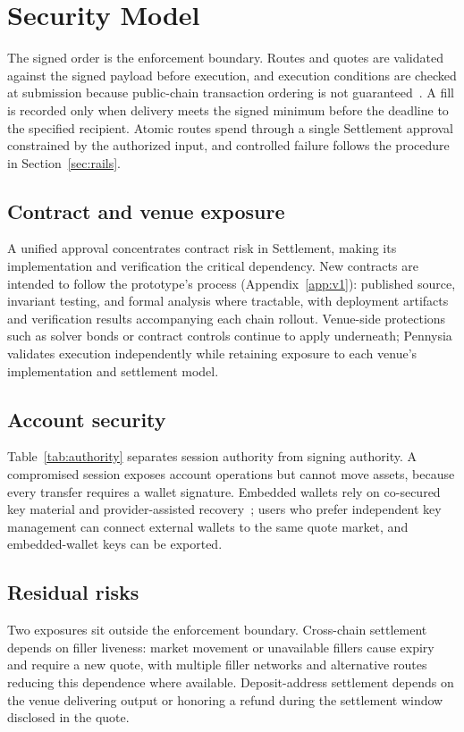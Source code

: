 \section{Security Model}\label{sec:security}

The signed order is the enforcement boundary. Routes and quotes are validated against the signed payload before execution, and execution conditions are checked at submission because public-chain transaction ordering is not guaranteed~\cite{flashboys}. A fill is recorded only when delivery meets the signed minimum before the deadline to the specified recipient. Atomic routes spend through a single Settlement approval constrained by the authorized input, and controlled failure follows the procedure in Section~\ref{sec:rails}.

\subsection{Contract and venue exposure}

A unified approval concentrates contract risk in Settlement, making its implementation and verification the critical dependency. New contracts are intended to follow the prototype's process (Appendix~\ref{app:v1}): published source, invariant testing, and formal analysis where tractable, with deployment artifacts and verification results accompanying each chain rollout. Venue-side protections such as solver bonds or contract controls continue to apply underneath; Pennysia validates execution independently while retaining exposure to each venue's implementation and settlement model.

\subsection{Account security}

Table~\ref{tab:authority} separates session authority from signing authority. A compromised session exposes account operations but cannot move assets, because every transfer requires a wallet signature. Embedded wallets rely on co-secured key material and provider-assisted recovery~\cite{threshold}; users who prefer independent key management can connect external wallets to the same quote market, and embedded-wallet keys can be exported.

\subsection{Residual risks}\label{sec:risk}

Two exposures sit outside the enforcement boundary. Cross-chain settlement depends on filler liveness: market movement or unavailable fillers cause expiry and require a new quote, with multiple filler networks and alternative routes reducing this dependence where available. Deposit-address settlement depends on the venue delivering output or honoring a refund during the settlement window disclosed in the quote.
